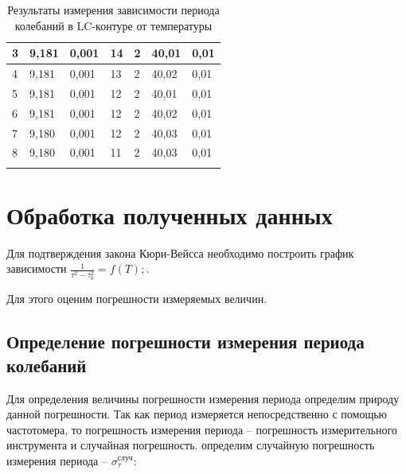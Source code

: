 \documentclass[10pt,a4paper]{article}
\begin{document}
\begin{longtable}[h!]{|l|l|l|l|l|l|l|}
3 & 9,181  & 0,001 & 14 & 2                      & 40,01 & 0,01                      \\ \hline
4 & 9,181  & 0,001 & 13 & 2                      & 40,02 & 0,01                      \\ \hline
5 & 9,181  & 0,001 & 12 & 2                      & 40,01 & 0,01                      \\ \hline
6 & 9,181  & 0,001 & 12 & 2                      & 40,02 & 0,01                      \\ \hline
7 & 9,180  & 0,001 & 12 & 2                      & 40,03 & 0,01                      \\ \hline
8 & 9,180  & 0,001 & 11 & 2                      & 40,03 & 0,01                      \\ \hline 

\caption{Результаты измерения зависимости периода колебаний в LC-контуре от температуры}
\end{longtable}

\newpage
	
	\section{Обработка полученных данных}
	
	Для подтверждения закона Кюри-Вейсса необходимо построить график зависимости $\frac{1}{\tau^{2} - \tau^{2}_{0}} = f\left(T\right);$.
	
	Для этого оценим погрешности измеряемых величин.
	
	\subsection{Определение погрешности измерения периода колебаний}
	
		Для определения величины погрешности измерения периода определим природу данной погрешности. Так как период измеряется непосредственно с помощью частотомера, то погрешность измерения периода -- погрешность измерительного инструмента и случайная погрешность. определим случайную погрешность измерения периода -- $\sigma_{\tau}^{\text{случ}}$:
		
\end{document}
